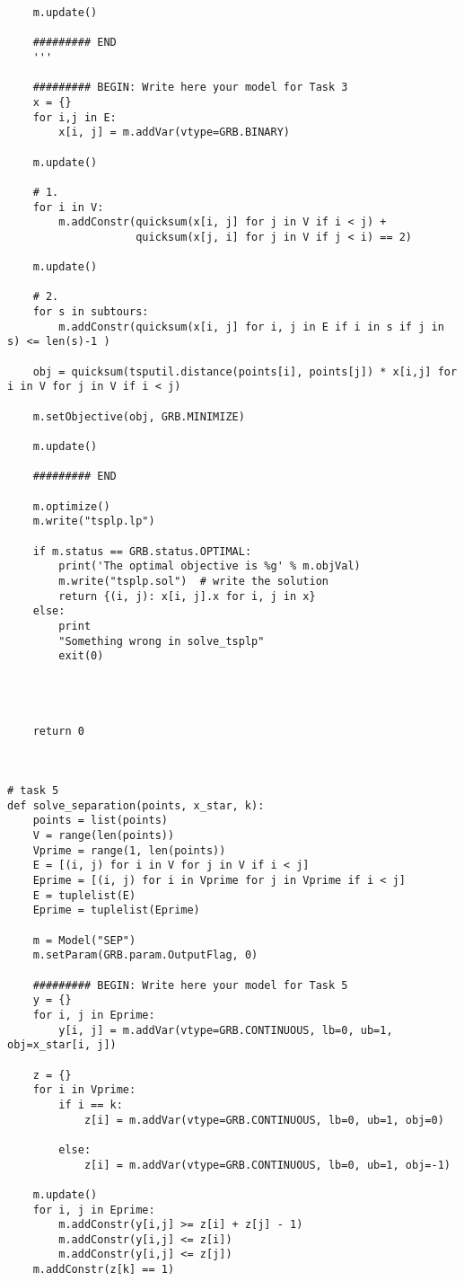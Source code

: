 \documentclass[a4paper,10pt]{article}
\begin{document}
\begin{lstlisting}
    m.update()

    ######### END
    '''

    ######### BEGIN: Write here your model for Task 3
    x = {}
    for i,j in E:
        x[i, j] = m.addVar(vtype=GRB.BINARY)

    m.update()

    # 1.
    for i in V:
        m.addConstr(quicksum(x[i, j] for j in V if i < j) +
                    quicksum(x[j, i] for j in V if j < i) == 2)

    m.update()

    # 2.
    for s in subtours:
        m.addConstr(quicksum(x[i, j] for i, j in E if i in s if j in s) <= len(s)-1 )

    obj = quicksum(tsputil.distance(points[i], points[j]) * x[i,j] for i in V for j in V if i < j)

    m.setObjective(obj, GRB.MINIMIZE)

    m.update()

    ######### END

    m.optimize()
    m.write("tsplp.lp")

    if m.status == GRB.status.OPTIMAL:
        print('The optimal objective is %g' % m.objVal)
        m.write("tsplp.sol")  # write the solution
        return {(i, j): x[i, j].x for i, j in x}
    else:
        print
        "Something wrong in solve_tsplp"
        exit(0)




    return 0



# task 5
def solve_separation(points, x_star, k):
    points = list(points)
    V = range(len(points))
    Vprime = range(1, len(points))
    E = [(i, j) for i in V for j in V if i < j]
    Eprime = [(i, j) for i in Vprime for j in Vprime if i < j]
    E = tuplelist(E)
    Eprime = tuplelist(Eprime)

    m = Model("SEP")
    m.setParam(GRB.param.OutputFlag, 0)

    ######### BEGIN: Write here your model for Task 5
    y = {}
    for i, j in Eprime:
        y[i, j] = m.addVar(vtype=GRB.CONTINUOUS, lb=0, ub=1, obj=x_star[i, j])

    z = {}
    for i in Vprime:
        if i == k:
            z[i] = m.addVar(vtype=GRB.CONTINUOUS, lb=0, ub=1, obj=0)

        else:
            z[i] = m.addVar(vtype=GRB.CONTINUOUS, lb=0, ub=1, obj=-1)

    m.update()
    for i, j in Eprime:
        m.addConstr(y[i,j] >= z[i] + z[j] - 1)
        m.addConstr(y[i,j] <= z[i])
        m.addConstr(y[i,j] <= z[j])
    m.addConstr(z[k] == 1)


\end{lstlisting}
\end{document}
